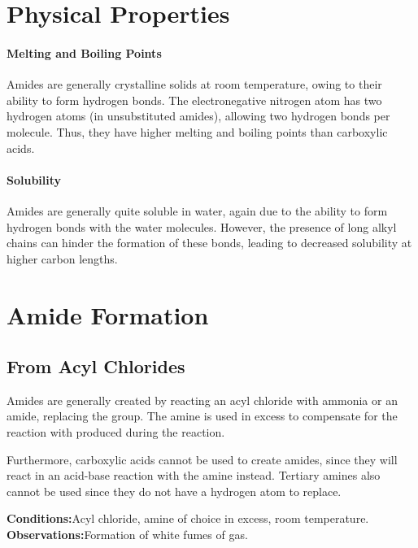 


	\section{Physical Properties}

		\paragraph{Melting and Boiling Points}

		Amides are generally crystalline solids at room temperature, owing to their ability to form hydrogen bonds. The electronegative
		nitrogen atom has two hydrogen atoms (in unsubstituted amides), allowing two hydrogen bonds per molecule. Thus, they have
		higher melting and boiling points than carboxylic acids.


		\paragraph{Solubility}

		Amides are generally quite soluble in water, again due to the ability to form hydrogen bonds with the water molecules. However,
		the presence of long alkyl chains can hinder the formation of these bonds, leading to decreased solubility at higher carbon lengths.




	\pagebreak
	\section{Amide Formation}

		\subsection{From Acyl Chlorides}

			Amides are generally created by reacting an acyl chloride with ammonia or an amide, replacing the \ch{\Cl} group. The amine is
			used in excess to compensate for the reaction with  produced during the reaction.

			Furthermore, carboxylic acids cannot be used to create amides, since they will react in an acid-base reaction with the amine instead.
			Tertiary amines also cannot be used since they do not have a hydrogen atom to replace.

			\vspace{1.5em}
			\vbox{\textbf{Conditions:}\tabto{35mm}Acyl chloride, amine of choice in excess, room temperature.}
			\vbox{\textbf{Observations:}\tabto{35mm}Formation of white fumes of  gas.}

